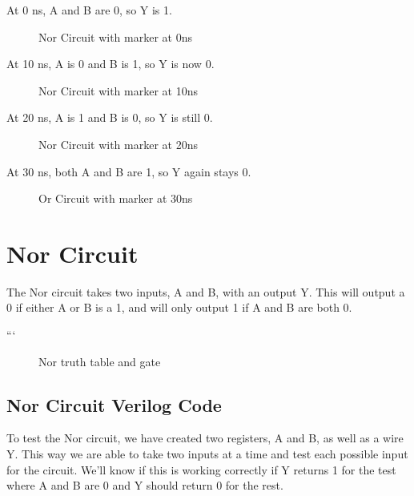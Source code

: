 \documentclass[12pt]{article}
\begin{document}
At 0 ns, A and B are 0, so Y is 1.
\begin{figure}[H]
    \centering
    \caption{Nor Circuit with marker at 0ns}
    \label{fig:enter-label}
\end{figure}

At 10 ns, A is 0 and B is 1, so Y is now 0.
\begin{figure}[H]
    \centering
    \caption{Nor Circuit with marker at 10ns}
    \label{fig:enter-label}
\end{figure}

At 20 ns, A is 1 and B is 0, so Y is still 0.
\begin{figure}[H]
    \centering
    \caption{Nor Circuit with marker at 20ns}
    \label{fig:enter-label}
\end{figure}

At 30 ns, both A and B are 1, so Y again stays 0.
\begin{figure}[H]
    \centering
    \caption{Or Circuit with marker at 30ns}
    \label{fig:enter-label}
\end{figure}

 \section{Nor Circuit}
The Nor circuit takes two inputs, A and B, with an output Y. This will output a 0 if either A or B is a 1, and will only output 1 if A and B are both 0.

```\begin{figure}[H]
    \centering
    \caption{Nor truth table and gate}
    \label{fig:shift-table}
\end{figure}

\subsection{Nor Circuit Verilog Code}


To test the Nor circuit, we have created two registers, A and B, as well as a wire Y. This way we are able to take two inputs at a time and test each possible input for the circuit. We'll know if this is working correctly if Y returns 1 for the test where A and B are 0 and Y should return 0 for the rest.
%
\end{document}
